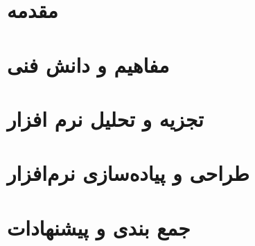 \documentclass[12pt,a4paper,oneside]{report}
\begin{document}

\thispagestyle{plain}
\tableofcontents
\listoffigures



\chapter{مقدمه}\clearpage


\chapter{مفاهیم و دانش فنی}\clearpage


\chapter{تجزیه و تحلیل نرم افزار}\clearpage


\chapter{طراحی و پیاده‌سازی نرم‌افزار}\clearpage


\chapter{جمع بندی و پیشنهادات}\clearpage

%



%
%

\end{document}
